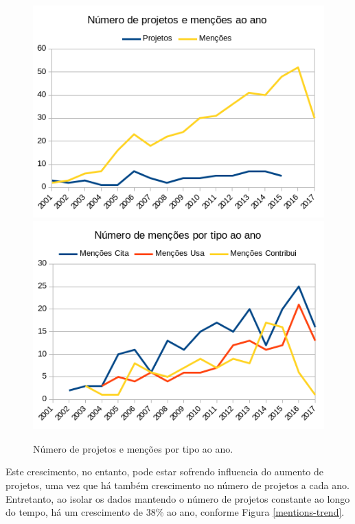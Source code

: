 \begin{figure}[h]
  \centering
  \includegraphics[scale=0.6]{imagens/mentions-projects-by-year.png}
  \includegraphics[scale=0.6]{imagens/mentions-type-by-year.png}
  \caption{Número de projetos e menções por tipo ao ano.}
  \label{mentions-by-year}
\end{figure}

Este crescimento, no entanto, pode estar sofrendo influencia do aumento de
projetos, uma vez que há também crescimento no número de projetos a cada ano.
Entretanto, ao isolar os dados mantendo o número de projetos constante ao longo
do tempo, há um crescimento de 38\% ao ano, conforme Figura
\ref{mentions-trend}.

